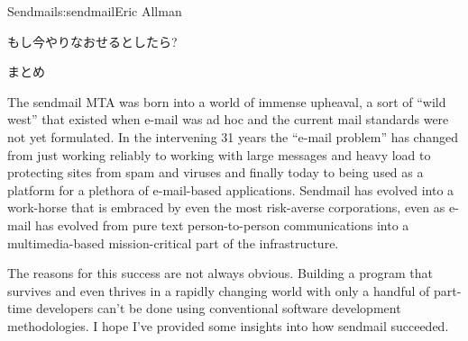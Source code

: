 \begin{aosachapter}{Sendmail}{s:sendmail}{Eric Allman}
\begin{aosasect1}{もし今やりなおせるとしたら?}
\end{aosasect1}

\begin{aosasect1}{まとめ}

The sendmail MTA was born into a world of immense upheaval, a sort of
``wild west'' that existed when e-mail was ad hoc and the current mail
standards were not yet formulated.  In the intervening 31 years the
``e-mail problem'' has changed from just working reliably to working
with large messages and heavy load to protecting sites from spam and
viruses and finally today to being used as a platform for a plethora
of e-mail-based applications.  Sendmail has evolved into a work-horse
that is embraced by even the most risk-averse corporations, even as
e-mail has evolved from pure text person-to-person communications into
a multimedia-based mission-critical part of the infrastructure.

The reasons for this success are not always obvious.  Building a
program that survives and even thrives in a rapidly changing world
with only a handful of part-time developers can't be done using
conventional software development methodologies.  I hope I've provided
some insights into how sendmail succeeded.

\end{aosasect1}

\end{aosachapter}
